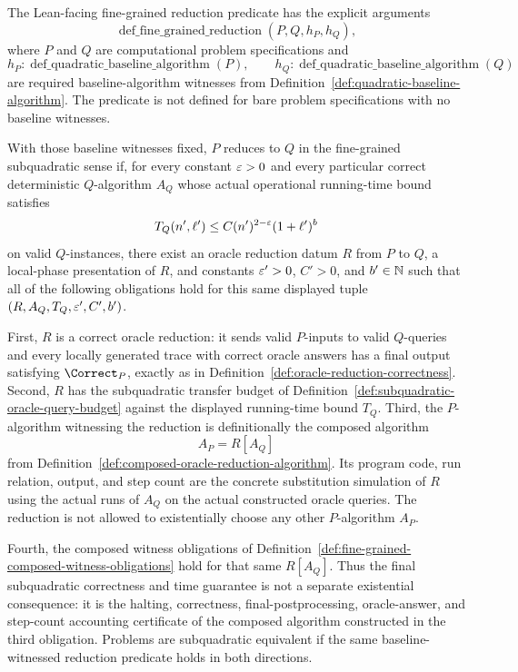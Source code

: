 \begin{definition}
  \label{def:fine-grained-reduction}
  The Lean-facing fine-grained reduction predicate has the explicit arguments
  \[
    \operatorname{def\_fine\_grained\_reduction}
      (P,Q,h_P,h_Q),
  \]
  where $P$ and $Q$ are computational problem specifications and
  \[
    h_P:\operatorname{def\_quadratic\_baseline\_algorithm}(P),
    \qquad
    h_Q:\operatorname{def\_quadratic\_baseline\_algorithm}(Q)
  \]
  are required baseline-algorithm witnesses from
  Definition~\ref{def:quadratic-baseline-algorithm}.  The predicate is not
  defined for bare problem specifications with no baseline witnesses.

  With those baseline witnesses fixed, $P$ reduces to $Q$ in the fine-grained
  subquadratic sense if, for every constant $\varepsilon>0$ and every particular
  correct deterministic $Q$-algorithm $A_Q$ whose actual operational
  running-time bound satisfies
  \[
    T_Q(n',\ell')\leq C(n')^{2-\varepsilon}(1+\ell')^b
  \]
  on valid $Q$-instances, there exist an oracle reduction datum $R$ from
  $P$ to $Q$, a local-phase presentation of $R$, and constants
  $\varepsilon'>0$, $C'>0$, and $b'\in\mathbb{N}$ such that all of the following obligations
  hold for this same displayed tuple $(R,A_Q,T_Q,\varepsilon',C',b')$.

  First, $R$ is a correct oracle reduction: it sends valid $P$-inputs to valid
  $Q$-queries and every locally generated trace with correct oracle answers
  has a final output satisfying $\Correct_P$, exactly as in
  Definition~\ref{def:oracle-reduction-correctness}.  Second, $R$ has the
  subquadratic transfer budget of
  Definition~\ref{def:subquadratic-oracle-query-budget} against the displayed
  running-time bound $T_Q$.  Third, the $P$-algorithm witnessing the reduction
  is definitionally the composed algorithm
  \[
    A_P=R[A_Q]
  \]
  from Definition~\ref{def:composed-oracle-reduction-algorithm}.  Its program
  code, run relation, output, and step count are the concrete substitution
  simulation of $R$ using the actual runs of $A_Q$ on the actual constructed
  oracle queries.  The reduction is not allowed to existentially choose any
  other $P$-algorithm $A_P$.

  Fourth, the composed witness obligations of
  Definition~\ref{def:fine-grained-composed-witness-obligations} hold for that
  same $R[A_Q]$.  Thus the final subquadratic correctness and time guarantee is
  not a separate existential consequence: it is the halting, correctness,
  final-postprocessing, oracle-answer, and step-count accounting certificate of
  the composed algorithm constructed in the third obligation.  Problems are
  subquadratic equivalent if the same baseline-witnessed reduction predicate
  holds in both directions.
\end{definition}

